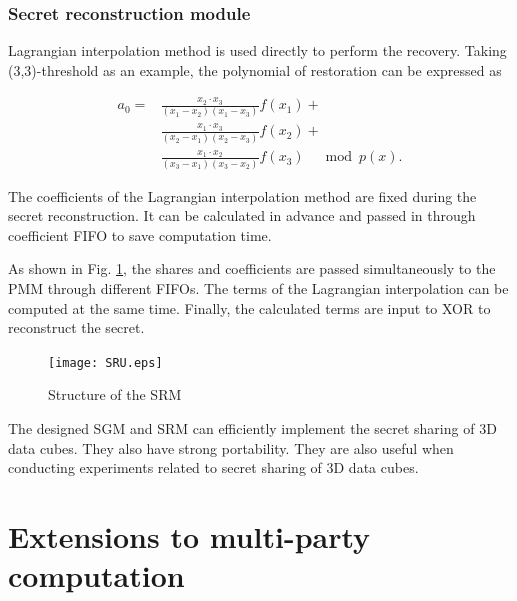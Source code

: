 \subsubsection{Secret reconstruction module}\label{subsec_NC-BPDVC_framework}

Lagrangian interpolation method is used directly to perform the recovery. Taking (3,3)-threshold as an example, the polynomial of restoration can be expressed as

\begin{equation}
\begin{aligned}
a_{0}= & \frac{x_{2} \cdot x_{3}}{\left(x_{1}-x_{2}\right)\left(x_{1}-x_{3}\right)} f\left(x_{1}\right)+ \\
& \frac{x_{1} \cdot x_{3}}{\left(x_{2}-x_{1}\right)\left(x_{2}-x_{3}\right)} f\left(x_{2}\right)+ \\
& \frac{x_{1} \cdot x_{2}}{\left(x_{3}-x_{1}\right)\left(x_{3}-x_{2}\right)} f\left(x_{3}\right) \quad \bmod p(x).
\end{aligned}
\end{equation}

The coefficients of the Lagrangian interpolation method are fixed during the secret reconstruction. It can be calculated in advance and passed in through coefficient FIFO to save computation time.

As shown in Fig. \ref{fig11}, the shares and coefficients are passed simultaneously to the PMM through different FIFOs. The terms of the Lagrangian interpolation can be computed at the same time. Finally, the calculated terms are input to XOR to reconstruct the secret.

\begin{figure}[!htb]
	\begin{center}
		\texttt{[image: SRU.eps]}\\
		\caption{Structure of the SRM}
		\label{fig11}
		\vspace{-2.0em}
	\end{center}
\end{figure}

The designed SGM and SRM can efficiently implement the secret sharing of 3D data cubes. They also have strong portability. They are also useful when conducting experiments related to secret sharing of 3D data cubes.

\section{Extensions to multi-party computation}\label{Sec_Multi-party}

